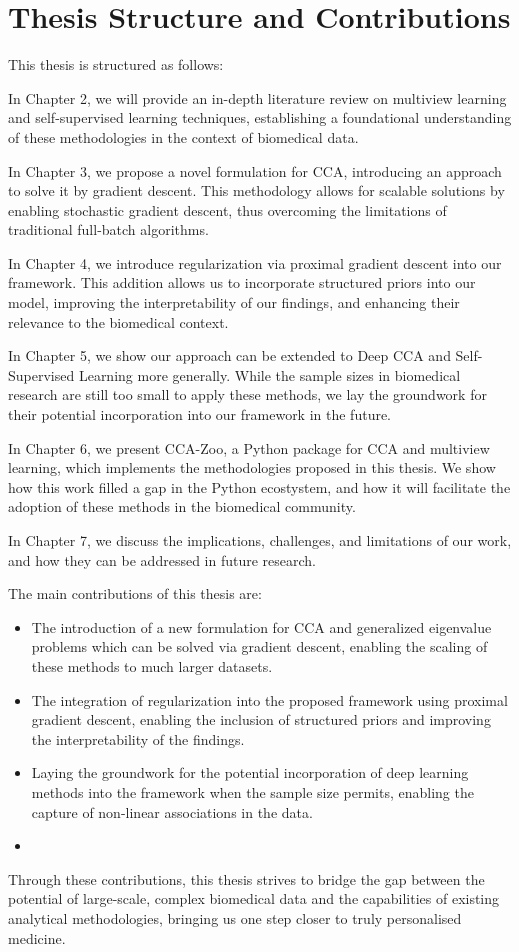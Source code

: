 \section{Thesis Structure and Contributions}

This thesis is structured as follows:

In Chapter 2, we will provide an in-depth literature review on multiview learning and self-supervised learning techniques, establishing a foundational understanding of these methodologies in the context of biomedical data.

In Chapter 3, we propose a novel formulation for CCA, introducing an approach to solve it by gradient descent. This methodology allows for scalable solutions by enabling stochastic gradient descent, thus overcoming the limitations of traditional full-batch algorithms.

In Chapter 4, we introduce regularization via proximal gradient descent into our framework. This addition allows us to incorporate structured priors into our model, improving the interpretability of our findings, and enhancing their relevance to the biomedical context.

In Chapter 5, we show our approach can be extended to Deep CCA and Self-Supervised Learning more generally. While the sample sizes in biomedical research are still too small to apply these methods, we lay the groundwork for their potential incorporation into our framework in the future.

In Chapter 6, we present CCA-Zoo, a Python package for CCA and multiview learning, which implements the methodologies proposed in this thesis. We show how this work filled a gap in the Python ecostystem, and how it will facilitate the adoption of these methods in the biomedical community.

In Chapter 7, we discuss the implications, challenges, and limitations of our work, and how they can be addressed in future research.

The main contributions of this thesis are:

\begin{itemize}
    \item The introduction of a new formulation for CCA and generalized eigenvalue problems which can be solved via gradient descent, enabling the scaling of these methods to much larger datasets.
    \item The integration of regularization into the proposed framework using proximal gradient descent, enabling the inclusion of structured priors and improving the interpretability of the findings.
    \item Laying the groundwork for the potential incorporation of deep learning methods into the framework when the sample size permits, enabling the capture of non-linear associations in the data.
    \item
\end{itemize}

Through these contributions, this thesis strives to bridge the gap between the potential of large-scale, complex biomedical data and the capabilities of existing analytical methodologies, bringing us one step closer to truly personalised medicine.